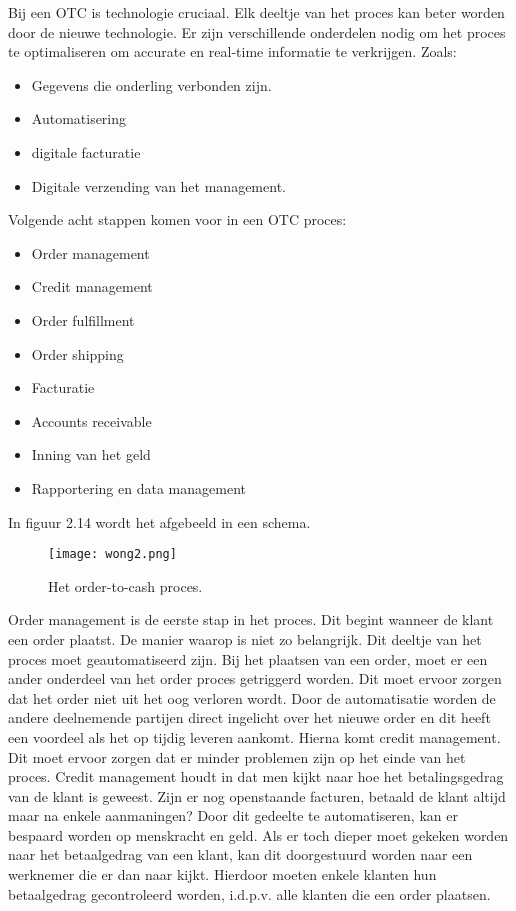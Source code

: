 Bij een OTC is technologie cruciaal. Elk deeltje van het proces kan beter worden door de nieuwe  technologie. Er zijn verschillende onderdelen nodig om het proces te optimaliseren om accurate en real-time informatie te verkrijgen. Zoals: 
\begin{itemize}
	\item Gegevens die onderling verbonden zijn.
	\item Automatisering
	\item digitale facturatie
	\item Digitale verzending van het management.
\end{itemize}

Volgende acht stappen komen voor in een OTC proces:
\begin{itemize}
	\item Order management
	\item Credit management
	\item Order fulfillment
	\item Order shipping
	\item Facturatie
	\item Accounts receivable
	\item Inning van het geld
	\item Rapportering en data management
\end{itemize}
In figuur 2.14 wordt het afgebeeld in een schema.
\begin{figure}[h]
	\texttt{[image: wong2.png]}
	\caption{Het order-to-cash proces. \textcite{Wong2018}}
	\centering
\end{figure}
Order management is de eerste stap in het proces. Dit begint wanneer de klant een order plaatst. De manier waarop is niet zo belangrijk. Dit deeltje van het proces moet geautomatiseerd zijn. Bij het plaatsen van een order, moet er een ander onderdeel van het order proces getriggerd worden. Dit moet ervoor zorgen dat het order niet uit het oog verloren wordt. Door de automatisatie worden de andere deelnemende partijen direct ingelicht over het nieuwe  order en dit heeft een voordeel als het op tijdig leveren aankomt.
Hierna komt credit management. Dit moet ervoor zorgen dat er minder problemen zijn op het einde van het proces. Credit management houdt in dat men kijkt naar hoe het betalingsgedrag van de klant is geweest. Zijn er nog openstaande facturen, betaald de klant altijd maar na enkele aanmaningen? Door dit gedeelte te automatiseren, kan er bespaard worden op menskracht en geld. Als er toch dieper moet gekeken worden naar het betaalgedrag van een klant, kan dit doorgestuurd worden naar een  werknemer die er dan naar kijkt. Hierdoor moeten enkele klanten hun betaalgedrag gecontroleerd worden, i.d.p.v. alle klanten die een order plaatsen. 
